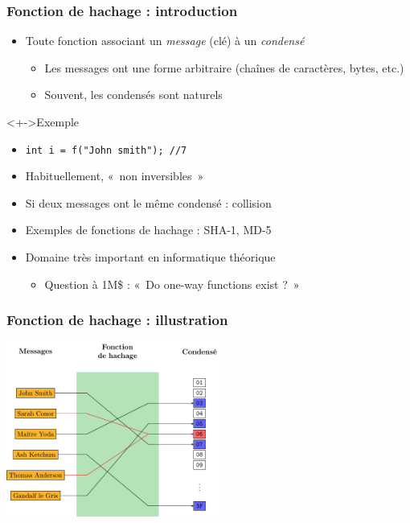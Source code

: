 \begin{frame}
\frametitle{Fonction de hachage : introduction}
\begin{itemize}[<+->]
\item Toute fonction associant un \emph{message} (clé) à un \emph{condensé}
	\begin{itemize}
	\item Les messages ont une forme arbitraire (chaînes de caractères, bytes, etc.)
	\item Souvent, les condensés sont naturels
	\end{itemize}
\end{itemize}
\begin{exampleblock}<+->{Exemple}
	\begin{itemize}
	\item \lstinline|int i = f("John smith"); //7|
	\end{itemize}
\end{exampleblock}
\begin{itemize}[<+->]
\item Habituellement, «~non inversibles~»
\item Si deux messages ont le même condensé : collision
\item Exemples de fonctions de hachage : \textsc{SHA-1}, \textsc{MD-5}
\item Domaine très important en informatique théorique
	\begin{itemize}
	\item Question à 1M\$ : «~Do one-way functions exist ?~»
	\end{itemize}
\end{itemize}
\end{frame}

\begin{frame}
\frametitle{Fonction de hachage : illustration}
\begin{center}
\includegraphics[width=7cm]{pics/hash.pdf}
\end{center}
\end{frame}


